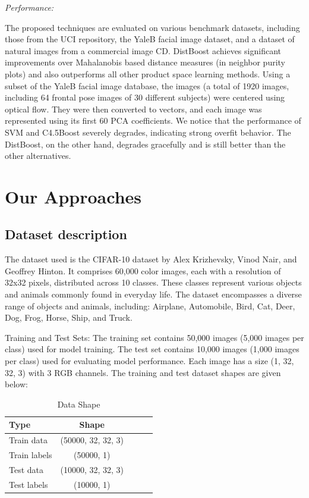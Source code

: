 \documentclass[a4paper]{article}
\theoremstyle{plain}
\theoremstyle{definition}
\begin{document}
{\noindent \textit {Performance:} \newline

The proposed techniques are evaluated on various benchmark datasets, including those from the UCI
repository, the YaleB facial image dataset, and a dataset of natural images from a commercial image CD. DistBoost achieves significant improvements over Mahalanobis based distance measures (in neighbor purity plots) and also outperforms all other product space learning methods.
Using a subset of the YaleB facial image database, the images (a total of 1920 images, including 64 frontal pose images of 30 different subjects) were centered using optical flow. They were then converted to vectors, and each image was represented using its first 60 PCA coefficients.
We notice that the performance of SVM and C4.5Boost severely degrades, indicating strong overfit behavior. The DistBoost, on the other hand, degrades gracefully and is still better than the other alternatives.


 
\newpage
	
	
	\section{Our Approaches}
	\label{sec:app}
 \subsection{Dataset description}
The dataset used is the CIFAR-10 dataset by Alex Krizhevsky, Vinod Nair, and Geoffrey Hinton. It comprises 60,000 color images, each with a resolution of 32x32 pixels, distributed across 10 classes. These classes represent various objects and animals commonly found in everyday life. The dataset encompasses a diverse range of objects and animals, including:
Airplane, Automobile, Bird, Cat, Deer, Dog, Frog, Horse, Ship, and Truck.
\newline

\noindent Training and Test Sets:
The training set contains 50,000 images (5,000 images per class) used for model training.
The test set contains 10,000 images (1,000 images per class) used for evaluating model performance. Each image has a size (1, 32, 32, 3) with 3 RGB channels. The training and test dataset shapes are given below:
\newline

\begin{table}[H]
    \centering
    \caption{Data Shape}
    \begin{tabular}{lcccc}
        \hline
        Type & Shape \\
        \hline
        Train data & (50000, 32, 32, 3) \\
        Train labels & (50000, 1) \\
        Test data & (10000, 32, 32, 3) \\
        Test labels & (10000, 1) \\
        \hline
    \end{tabular}
\end{table}

}
\end{document}
